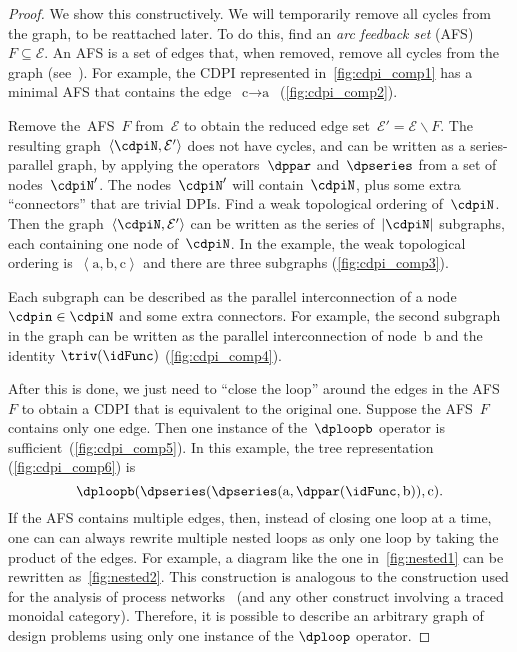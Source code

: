 \begin{proof}
    We show this constructively. We will temporarily remove all cycles
    from the graph, to be reattached later. To do this, find an \emph{arc
    feedback set} (AFS) $F\subseteq\mathcal{E}$. An AFS is a set of edges
    that, when removed, remove all cycles from the graph (see~\cite{golovach15incremental}).
    For example, the CDPI represented in~\cref{fig:cdpi_comp1} has a minimal
    AFS that contains the edge~$\text{c}\rightarrow\text{a}$~(\cref{fig:cdpi_comp2}).


    Remove the~AFS~$F$ from~$\mathcal{E}$ to obtain the reduced edge
    set~$\mathcal{E}'=\mathcal{E}\backslash F$. The resulting graph~$\left\langle \cdpiN,\mathcal{E}'\right\rangle $
    does not have cycles, and can be written as a series-parallel graph,
    by applying the operators~$\dppar$ and~$\dpseries$ from a set
    of nodes~$\cdpiN'$. The nodes~$\cdpiN'$ will contain~$\cdpiN$,
    plus some extra ``connectors'' that are trivial DPIs. Find a weak
    topological ordering of~$\cdpiN$. Then the graph~$\left\langle \cdpiN,\mathcal{E}'\right\rangle $
    can be written as the series of~$|\cdpiN|$ subgraphs, each containing
    one node of~$\cdpiN$. In the example, the weak topological ordering
    is~$\left\langle \text{a},\text{b},\text{c}\right\rangle $ and there
    are three subgraphs (\cref{fig:cdpi_comp3}).


    \noindent Each subgraph can be described as the parallel interconnection
    of a node~$\cdpin\in\cdpiN$ and some extra connectors. For example,
    the second subgraph in the graph can be written as the parallel interconnection
    of node~$\text{b}$ and the identity $\triv(\idFunc)$ (\cref{fig:cdpi_comp4}).


    After this is done, we just need to ``close the loop'' around the
    edges in the AFS~$F$ to obtain a CDPI that is equivalent to the
    original one. Suppose the AFS~$F$ contains only one edge. Then one
    instance of the~$\dploopb$ operator is sufficient~(\cref{fig:cdpi_comp5}).
    In this example, the tree representation (\cref{fig:cdpi_comp6}) is
    \[
        \dploopb(\dpseries(\dpseries(\text{a},\dppar(\idFunc,\text{b})),\text{c}).
    \]
    If the AFS contains multiple edges, then, instead of closing one loop
    at a time, one can can always rewrite multiple nested loops as only
    one loop by taking the product of the edges. For example, a diagram
    like the one in~\cref{fig:nested1} can be rewritten as~\cref{fig:nested2}.
    This construction is analogous to the construction used for the analysis
    of process networks~\cite{lee10} (and any other construct involving
    a traced monoidal category). Therefore, it is possible to describe
    an arbitrary graph of design problems using only one instance of the
    $\dploop$ operator.
\end{proof}

